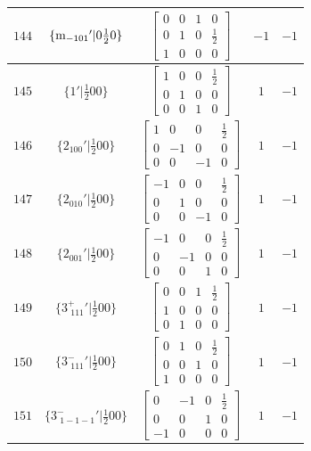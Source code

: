 \documentclass[fleqn,8pt]{jsarticle}
\begin{document}
\begin{longtable}{ccccc}
$ 144 $ & $ \{{\rm m}_{-101}{}'|0 \frac{1}{2} 0\} $ & $ \begin{bmatrix} 0 & 0 & 1 & 0 \\ 0 & 1 & 0 & \frac{1}{2} \\ 1 & 0 & 0 & 0 \end{bmatrix} $ & $ -1 $ & $ -1 $ \\ \hline
$ 145 $ & $ \{1{}'|\frac{1}{2} 0 0\} $ & $ \begin{bmatrix} 1 & 0 & 0 & \frac{1}{2} \\ 0 & 1 & 0 & 0 \\ 0 & 0 & 1 & 0 \end{bmatrix} $ & $ 1 $ & $ -1 $ \\ \hline
$ 146 $ & $ \{2{}_{100}{}'|\frac{1}{2} 0 0\} $ & $ \begin{bmatrix} 1 & 0 & 0 & \frac{1}{2} \\ 0 & -1 & 0 & 0 \\ 0 & 0 & -1 & 0 \end{bmatrix} $ & $ 1 $ & $ -1 $ \\ \hline
$ 147 $ & $ \{2{}_{010}{}'|\frac{1}{2} 0 0\} $ & $ \begin{bmatrix} -1 & 0 & 0 & \frac{1}{2} \\ 0 & 1 & 0 & 0 \\ 0 & 0 & -1 & 0 \end{bmatrix} $ & $ 1 $ & $ -1 $ \\ \hline
$ 148 $ & $ \{2{}_{001}{}'|\frac{1}{2} 0 0\} $ & $ \begin{bmatrix} -1 & 0 & 0 & \frac{1}{2} \\ 0 & -1 & 0 & 0 \\ 0 & 0 & 1 & 0 \end{bmatrix} $ & $ 1 $ & $ -1 $ \\ \hline
$ 149 $ & $ \{3^{+}_{\,\,111}{}'|\frac{1}{2} 0 0\} $ & $ \begin{bmatrix} 0 & 0 & 1 & \frac{1}{2} \\ 1 & 0 & 0 & 0 \\ 0 & 1 & 0 & 0 \end{bmatrix} $ & $ 1 $ & $ -1 $ \\ \hline
$ 150 $ & $ \{3^{-}_{\,\,111}{}'|\frac{1}{2} 0 0\} $ & $ \begin{bmatrix} 0 & 1 & 0 & \frac{1}{2} \\ 0 & 0 & 1 & 0 \\ 1 & 0 & 0 & 0 \end{bmatrix} $ & $ 1 $ & $ -1 $ \\ \hline
$ 151 $ & $ \{3^{-}_{\,\,1-1-1}{}'|\frac{1}{2} 0 0\} $ & $ \begin{bmatrix} 0 & -1 & 0 & \frac{1}{2} \\ 0 & 0 & 1 & 0 \\ -1 & 0 & 0 & 0 \end{bmatrix} $ & $ 1 $ & $ -1 $ \\ \hline

\end{longtable}
\end{document}
